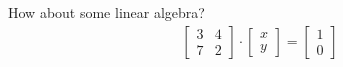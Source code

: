   How about some linear algebra?
  \begin{align}
    \begin{bmatrix}
       3 & 4 \\
       7 & 2
    \end{bmatrix}
    \cdot
    \begin{bmatrix}
       x \\ y
    \end{bmatrix}
    =
    \begin{bmatrix}
       1 \\ 0
    \end{bmatrix}
  \end{align}
